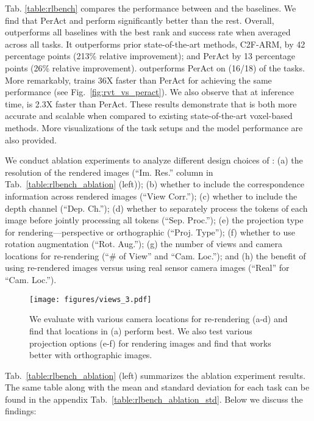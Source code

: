 Tab. \ref{table:rlbench} compares the performance between \method and the baselines. We find that PerAct and \method perform significantly better than the rest.
Overall, \method outperforms all baselines with the best rank and success rate when averaged across all tasks. It outperforms prior state-of-the-art methods, C2F-ARM, by 42 percentage points (213\% relative improvement); and PerAct by 13 percentage points (26\% relative improvement). \method outperforms PerAct on  (16/18) of the tasks. More remarkably, \method trains 36X faster than PerAct for achieving the same performance (see Fig.~\ref{fig:rvt_vs_peract}). We also observe that at inference time, \method is 2.3X faster than PerAct. 
These results demonstrate that \method is both more accurate and scalable when compared to existing state-of-the-art voxel-based methods. More visualizations of the task setups and the model performance are also provided.

We conduct ablation experiments to analyze different design choices of \method: (a) the resolution of the rendered images (``Im. Res.'' column in Tab.~\ref{table:rlbench_ablation} (left)); (b) whether to include the correspondence information across rendered images (``View Corr.''); (c) whether to include the depth channel (``Dep. Ch.''); (d) whether to separately process the tokens of each image before jointly processing all tokens (``Sep. Proc.''); (e) the projection type for rendering---perspective or orthographic (``Proj. Type''); (f) whether to use rotation augmentation (``Rot. Aug.''); (g) the number of views and camera locations for re-rendering (``\# of View'' and ``Cam. Loc.''); and (h) the benefit of using re-rendered images versus using real sensor camera images (``Real'' for ``Cam. Loc.'').
\begin{figure*}[!t]
\centering
\texttt{[image: figures/views\_3.pdf]}
\caption{We evaluate \method with various camera locations for re-rendering (a-d) and find that locations in (a) perform best. We also test various projection options (e-f) for rendering images and find that \method works better with orthographic images.}
\vspace{-3mm}
\label{fig:view}
\end{figure*}

Tab.~\ref{table:rlbench_ablation} (left) summarizes the ablation experiment results. The same table along with the mean and standard deviation for each task can be found in the appendix Tab.~\ref{table:rlbench_ablation_std}. Below we discuss the findings: 

